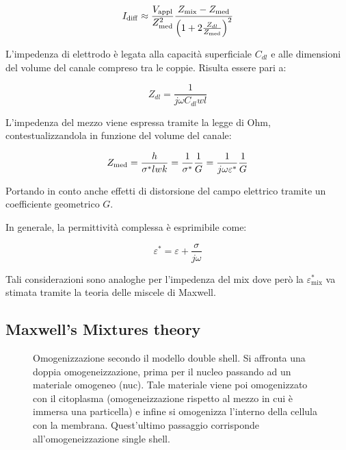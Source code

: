 \begin{equation}
	I_{\operatorname{d i f f}}\approx {V_{\operatorname{a p p l}}\over Z_{\operatorname{m e d}}^2} \frac{Z_{\operatorname{m i x}} -Z_{\operatorname{m e d}}}{\left(1+ 2{Z_{dl}\over Z_{\operatorname{m e d}} }\right)^2}
	\label{eq:idiff}
\end{equation}

L'impedenza di elettrodo è legata alla capacità superficiale $C_{dl}$ e alle dimensioni del volume del canale compreso tra le coppie. Risulta essere pari a:

\begin{equation}
	Z_{d l}=\frac{1}{j \omega C_{d l} w l}
\end{equation}

L'impedenza del mezzo viene espressa tramite la legge di Ohm, contestualizzandola in funzione del volume del canale:

\begin{equation}
	Z_{\operatorname{m e d}}=\frac{h}{\sigma^{*} l w k}={1\over \sigma^*}{1\over G}={1\over j\omega \varepsilon ^*}{1\over G}
\end{equation}

Portando in conto anche effetti di distorsione del campo elettrico tramite un coefficiente geometrico $G$. 

In generale, la permittività complessa è esprimibile come:

\begin{equation}
	\varepsilon^{*}=\varepsilon+\frac{\sigma}{j \omega}
\end{equation}

Tali considerazioni sono analoghe per l'impedenza del mix dove però la $\varepsilon^*_{\operatorname{m i x}}$ va stimata tramite la teoria delle miscele di Maxwell. 

\subsection{Maxwell's Mixtures theory}
\begin{figure}[t!]
	\centering
	\footnotesize{\def\svgwidth{0.95\linewidth}
		}
	\caption{Omogenizzazione secondo il modello double shell. Si affronta una doppia omogeneizzazione, prima per il nucleo passando ad un materiale omogeneo (nuc). Tale materiale viene poi omogenizzato con il citoplasma (omogeneizzazione rispetto al mezzo in cui è immersa una particella) e infine si omogenizza l'interno della cellula con la membrana. Quest'ultimo passaggio corrisponde all'omogeneizzazione single shell.}
	\label{fig:screenshot001}
\end{figure}

